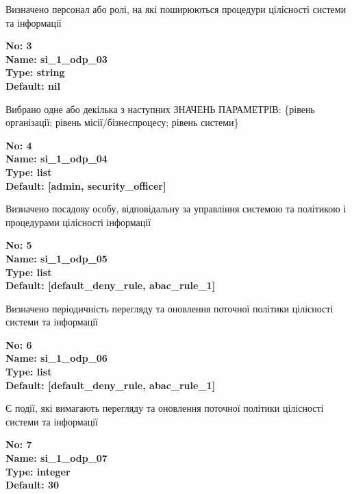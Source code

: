 \documentclass{article}
\begin{document}
{\footnotesize Визначено персонал або ролі, на які поширюються процедури цілісності системи та інформації }


{\footnotesize\bfseries
No: 3\\
Name: si\_\allowbreak{}1\_\allowbreak{}odp\_\allowbreak{}03\\
Type: string\\
Default: nil
}

{\footnotesize Вибрано одне або декілька з наступних ЗНАЧЕНЬ ПАРАМЕТРІВ: \{рівень організації; рівень місії/бізнеспроцесу; рівень системи\}}


{\footnotesize\bfseries
No: 4\\
Name: si\_\allowbreak{}1\_\allowbreak{}odp\_\allowbreak{}04\\
Type: list\\
Default: [\textquotedbl{}admin\textquotedbl{}, \textquotedbl{}security\_\allowbreak{}officer\textquotedbl{}]
}

{\footnotesize Визначено посадову особу, відповідальну за управління системою та політикою і процедурами цілісності інформації}


{\footnotesize\bfseries
No: 5\\
Name: si\_\allowbreak{}1\_\allowbreak{}odp\_\allowbreak{}05\\
Type: list\\
Default: [\textquotedbl{}default\_\allowbreak{}deny\_\allowbreak{}rule\textquotedbl{}, \textquotedbl{}abac\_\allowbreak{}rule\_\allowbreak{}1\textquotedbl{}]
}

{\footnotesize Визначено періодичність перегляду та оновлення поточної політики цілісності системи та інформації}


{\footnotesize\bfseries
No: 6\\
Name: si\_\allowbreak{}1\_\allowbreak{}odp\_\allowbreak{}06\\
Type: list\\
Default: [\textquotedbl{}default\_\allowbreak{}deny\_\allowbreak{}rule\textquotedbl{}, \textquotedbl{}abac\_\allowbreak{}rule\_\allowbreak{}1\textquotedbl{}]
}

{\footnotesize Є події, які вимагають перегляду та оновлення поточної політики цілісності системи та інформації}


{\footnotesize\bfseries
No: 7\\
Name: si\_\allowbreak{}1\_\allowbreak{}odp\_\allowbreak{}07\\
Type: integer\\
Default: 30
}
\end{document}
